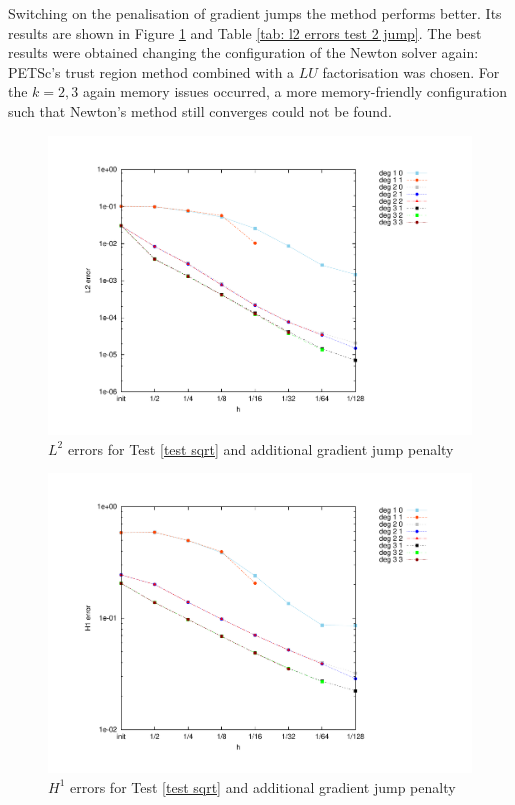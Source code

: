 Switching on the penalisation of gradient jumps the method performs better. Its results are shown in Figure \ref{fig: l2 errors test 2 jump} and Table \ref{tab: l2 errors test 2 jump}. The best results were obtained changing the configuration of the Newton solver again: PETSc's trust region method combined with a $LU$ factorisation was chosen. For the $k=2,3$ again memory issues occurred, a more memory-friendly configuration such that Newton's method still converges could not be found. %

\begin{figure}[H]
	\centering
	\includegraphics[scale =0.4]{plots/MA2_Neilan_GradJump_l2.pdf}
	\caption{$L^2$ errors for Test \ref{test sqrt}  and additional gradient jump penalty}
	\label{fig: l2 errors test 2 jump}
\end{figure}
\begin{figure}[H]
	\centering
	\includegraphics[scale =0.4]{plots/MA2_Neilan_GradJump_h1.pdf}
	\caption{$H^1$ errors for Test \ref{test sqrt}  and additional gradient jump penalty}
	\label{fig: h1 errors test 2 jump}
\end{figure}
